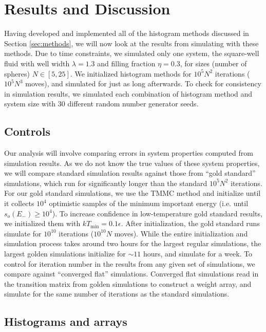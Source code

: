 \documentclass[11pt]{article}
\renewcommand{\t}{\text} %
\newcommand{\p}[1]{\left(#1\right)} %
\renewcommand{\sp}[1]{\left[#1\right]} %
\begin{document}
\section{Results and Discussion}
\label{sec:results}

Having developed and implemented all of the histogram methods
discussed in Section \ref{sec:methods}, we will now look at the
results from simulating with these methods. Due to time constraints,
we simulated only one system, the square-well fluid with well width
$\lambda=1.3$ and filling fraction $\eta=0.3$, for sizes (number of
spheres) $N\in\sp{5,25}$. We initialized histogram methods for
$10^5N^2$ iterations ($10^5N^3$ moves), and simulated for just as long
afterwards. To check for consistency in simulation results, we
simulated each combination of histogram method and system size with 30
different random number generator seeds.

\subsection{Controls}
\label{sec:controls}

Our analysis will involve comparing errors in system properties
computed from simulation results. As we do not know the true values of
these system properties, we will compare standard simulation results
against those from ``gold standard'' simulations, which run for
significantly longer than the standard $10^5N^2$ iterations. For our
gold standard simulations, we use the TMMC method and initialize until
it collects $10^4$ optimistic samples of the minimum important energy
(i.e. until $s_o\p{E_-}\ge 10^4$). To increase confidence in
low-temperature gold standard results, we initialized them with
$kT_{\t{min}}=0.1\epsilon$. After initialization, the gold standard
runs simulate for $10^{10}$ iterations ($10^{10}N$ moves). While the
entire initialization and simulation process takes around two hours
for the largest regular simulations, the largest golden simulations
initialize for $\sim11$ hours, and simulate for a week. To control for
iteration number in the results from any given set of simulations, we
compare against ``converged flat'' simulations. Converged flat
simulations read in the transition matrix from golden simulations to
construct a weight array, and simulate for the same number of
iterations as the standard simulations.

\subsection{Histograms and arrays}
\label{sec:histograms}
\end{document}
